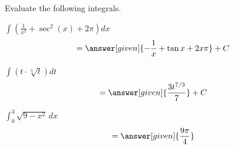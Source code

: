 \documentclass[handout]{ximera}
\begin{document}
\begin{problem}
Evaluate the following integrals.

\begin{question}
$\displaystyle\int\left(\frac{1}{x^2}+\sec^2(x)+2\pi\right)dx$
	\[
	\displaystyle  =    \answer[given]{-\frac{1}{x}+\tan{x}+2x\pi}+C
	\]
\end{question}

\begin{question}
$\displaystyle\int\left(t\cdot\sqrt[3]{t}\right)dt$
	\[
	\displaystyle  =    \answer[given]{\frac{3t^{7/3}}{7}}+C
	\]
\end{question}

\begin{question}
$\displaystyle\int_{0}^3\sqrt{9-x^2}\,dx$
	\[
	\displaystyle  =    \answer[given]{\frac{9\pi}{4}}
	\]
\end{question}

\end{problem}
\end{document}
